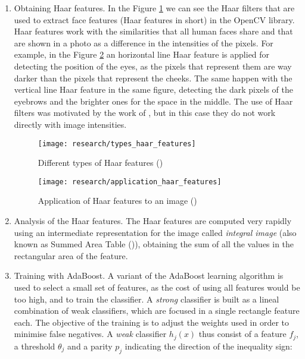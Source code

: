 	\begin{enumerate}
		\item Obtaining Haar features. In the Figure \ref{fig:haar_features} we can see the Haar filters that are used to extract face features (Haar features in short) in the OpenCV library. Haar features work with the similarities that all human faces share and that are shown in a photo as a difference in the intensities of the pixels. For example, in the Figure \ref{fig:application_haar_features} an horizontal line Haar feature is applied for detecting the position of the eyes, as the pixels that represent them are way darker than the pixels that represent the cheeks. The same happen with the vertical line Haar feature in the same figure, detecting the dark pixels of the eyebrows and the brighter ones for the space in the middle. The use of Haar filters was motivated by the work of \cite{haar_features_before_vj}, but in this case they do not work directly with image intensities. 

		\begin{figure}[!ht]
			\centering
			\vspace{0.15cm}
			\texttt{[image: research/types\_haar\_features]}
			\caption{Different types of Haar features (\cite{opencv_haar_cascade_tut})}
			\label{fig:haar_features}
		\end{figure}

		\begin{figure}[!ht]
			\centering
			\texttt{[image: research/application\_haar\_features]}
			\caption{Application of Haar features to an image (\cite{viola2001rapid})}
			\label{fig:application_haar_features}
		\end{figure}

		\item Analysis of the Haar features. The Haar features are computed very rapidly using an intermediate representation for the image called \textit{integral image} (also known as Summed Area Table (\cite{crow_summed_table})), obtaining the sum of all the values in the rectangular area of the feature. 

		\item Training with AdaBoost. A variant of the AdaBoost learning algorithm is used to select a small set of features, as the cost of using all features would be too high, and to train the classifier. A \textit{strong} classifier is built as a lineal combination of weak classifiers, which are focused in a single rectangle feature each. The objective of the training is to adjust the weights used in order to minimise false negatives. A \textit{weak} classifier $h_j(x)$ thus consist of a feature $f_j$, a threshold $\theta_j$ and a parity $p_j$ indicating the direction of the inequality sign:


\end{enumerate}
